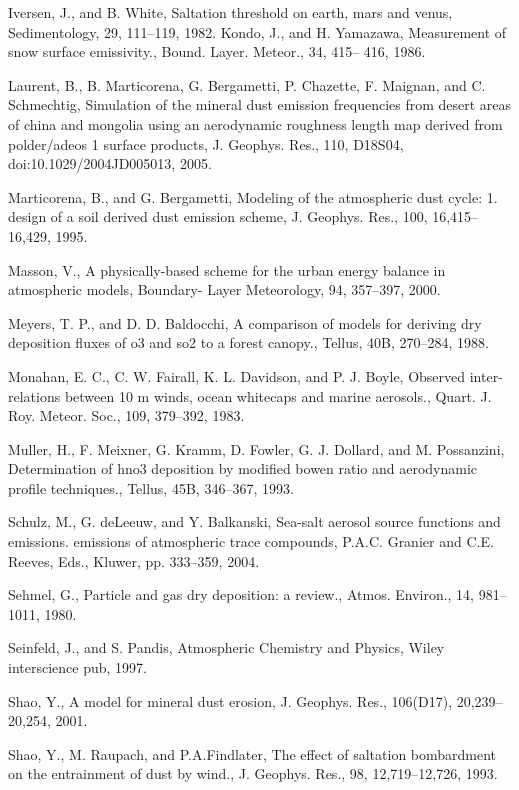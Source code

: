 \begin{description}
Iversen, J., and B. White, Saltation threshold on earth, mars and venus, Sedimentology, 29, 111–119, 1982.
Kondo, J., and H. Yamazawa, Measurement of snow surface emissivity., Bound. Layer. Meteor., 34, 415–
  416, 1986.
\item
Laurent, B., B. Marticorena, G. Bergametti, P. Chazette, F. Maignan, and C. Schmechtig, Simulation of
  the mineral dust emission frequencies from desert areas of china and mongolia using an aerodynamic
  roughness length map derived from polder/adeos 1 surface products, J. Geophys. Res., 110, D18S04,
  doi:10.1029/2004JD005013, 2005.
\item
Marticorena, B., and G. Bergametti, Modeling of the atmospheric dust cycle: 1. design of a soil derived dust
  emission scheme, J. Geophys. Res., 100, 16,415–16,429, 1995.
\item
Masson, V., A physically-based scheme for the urban energy balance in atmospheric models, Boundary-
  Layer Meteorology, 94, 357–397, 2000.
\item
Meyers, T. P., and D. D. Baldocchi, A comparison of models for deriving dry deposition fluxes of o3 and
  so2 to a forest canopy., Tellus, 40B, 270–284, 1988.
\item
Monahan, E. C., C. W. Fairall, K. L. Davidson, and P. J. Boyle, Observed inter-relations between 10 m
  winds, ocean whitecaps and marine aerosols., Quart. J. Roy. Meteor. Soc., 109, 379–392, 1983.
\item
Muller, H., F. Meixner, G. Kramm, D. Fowler, G. J. Dollard, and M. Possanzini, Determination of hno3
  deposition by modified bowen ratio and aerodynamic profile techniques., Tellus, 45B, 346–367, 1993.
\item
Schulz, M., G. deLeeuw, and Y. Balkanski, Sea-salt aerosol source functions and emissions. emissions of
  atmospheric trace compounds, P.A.C. Granier and C.E. Reeves, Eds., Kluwer, pp. 333–359, 2004.
\item
Sehmel, G., Particle and gas dry deposition: a review., Atmos. Environ., 14, 981–1011, 1980.
\item
Seinfeld, J., and S. Pandis, Atmospheric Chemistry and Physics, Wiley interscience pub, 1997.
\item
Shao, Y., A model for mineral dust erosion, J. Geophys. Res., 106(D17), 20,239–20,254, 2001.
\item
Shao, Y., M. Raupach, and P.A.Findlater, The effect of saltation bombardment on the entrainment of dust
  by wind., J. Geophys. Res., 98, 12,719–12,726, 1993.
\item

\end{description}
